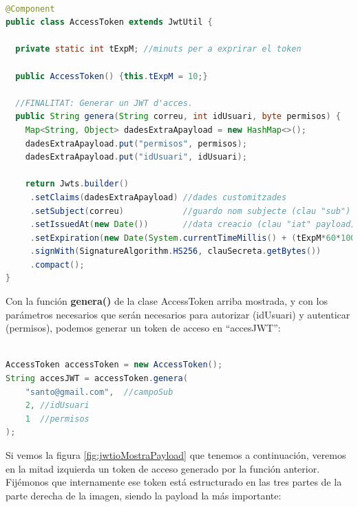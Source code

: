 \documentclass[a4paper,12pt]{report}
\begin{document}
		
\begin{lstlisting}[language=Java, basicstyle=\ttfamily\footnotesize, keywordstyle=\color{magenta}]
				
@Component
public class AccessToken extends JwtUtil {
	
  private static int tExpM; //minuts per a exprirar el token
	
  public AccessToken() {this.tExpM = 10;}
	
  //FINALITAT: Generar un JWT d'acces.
  public String genera(String correu, int idUsuari, byte permisos) {
	Map<String, Object> dadesExtraApayload = new HashMap<>();
	dadesExtraApayload.put("permisos", permisos);
	dadesExtraApayload.put("idUsuari", idUsuari);
		
	return Jwts.builder()
	 .setClaims(dadesExtraApayload) //dades customitzades
	 .setSubject(correu)            //guardo nom subjecte (clau "sub")
	 .setIssuedAt(new Date())       //data creacio (clau "iat" payload)
	 .setExpiration(new Date(System.currentTimeMillis() + (tExpM*60*1000)))
	 .signWith(SignatureAlgorithm.HS256, clauSecreta.getBytes())
	 .compact();
}


\end{lstlisting}
		
		
		
		Con la función \textbf{genera()} de la clase AccessToken arriba mostrada, y con los parámetros necesarios que serán necesarios para autorizar (idUsuari) y autenticar (permisos), podemos generar un token de acceso en ``accesJWT'':
		
		
		
\begin{lstlisting}[language=Java, basicstyle=\ttfamily\footnotesize, keywordstyle=\color{magenta}]

AccessToken accessToken = new AccessToken();
String accesJWT = accessToken.genera(
	"santo@gmail.com",  //campoSub
	2, //idUsuari
	1  //permisos
);


\end{lstlisting}
		
		Si vemos la figura \ref{fig:jwtioMostraPayload} que tenemos a continuación, veremos en la mitad izquierda un token de acceso generado por la función anterior. Fijémonos que internamente ese token está estructurado en las tres partes de la parte derecha de la imagen, siendo la payload la más importante:
		
\end{document}
